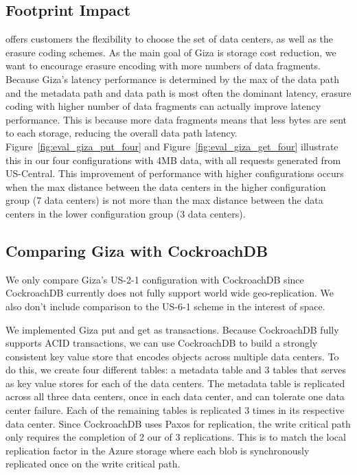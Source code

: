 \subsection{Footprint Impact}



\name offers customers the flexibility to choose the set of data centers, as well as the erasure coding schemes. As the main goal of Giza is storage cost reduction, we want to encourage erasure encoding with more numbers of data fragments. Because Giza’s latency performance is determined by the max of the data path and the metadata path and data path is most often the dominant latency, erasure coding with higher number of data fragments can actually improve latency performance. This is because more data fragments means that less bytes are sent to each storage, reducing the overall data path latency. Figure~\ref{fig:eval_giza_put_four} and  Figure~\ref{fig:eval_giza_get_four} illustrate this in our four configurations with 4MB data, with all requests generated from US-Central. This improvement of performance with higher configurations occurs when the max distance between the data centers in the higher configuration group (7 data centers) is not more than the max distance between the data centers in the lower configuration group (3 data centers).


\subsection{Comparing Giza with CockroachDB}
We only compare Giza's US-2-1 configuration with CockroachDB since CockroachDB currently does not fully support world wide geo-replication. We also don't include comparison to  the US-6-1 scheme in the interest of space.

We implemented Giza put and get as transactions. Because CockroachDB fully supports ACID transactions, we can use CockroachDB to build a strongly consistent key value store that encodes objects across multiple data centers. To do this, we create four different tables: a metadata table and 3 tables that serves as key value stores for each of the data centers. The metadata table is replicated across all three data centers, once in each data center, and can tolerate one data center failure. Each of the remaining tables is replicated 3 times in its respective data center. Since CockroachDB uses Paxos for replication, the write critical path only requires the completion of 2 our of 3 replications. This is to match the local replication factor in the Azure storage where each blob is synchronously replicated once on the write critical path.

